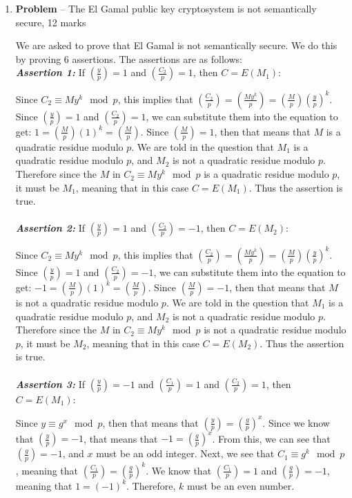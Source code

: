 \documentclass[11pt]{article}
\theoremstyle{definition}
\newcounter{problem}
\providecommand{\Leg}[2]{\genfrac{(}{)}{}{}{#1}{#2}}
\begin{document}
\begin{enumerate}
\begin{enumerate}
\end{enumerate}

\newpage

\item[] \textbf{Problem \theproblem} -- The El Gamal public key cryptosystem is not
    semantically secure, 12 marks

We are asked to prove that El Gamal is not semantically secure. We do this by proving 6 assertions. The assertions are as follows: \\

\textbf{\textit{Assertion 1:}} If $\Leg{y}{p} = 1$ and $\Leg{C_2}{p} = 1$, then $C = E(M_1)$:

Since $C_2 \equiv My^k \mod{p}$, this implies that $\Leg{C_2}{p} = \Leg{My^k}{p} = \Leg{M}{p} \Leg{y}{p}^k$. Since $\Leg{y}{p} = 1$ and $\Leg{C_2}{p} = 1$, we can substitute them into the equation to get: $1 = \Leg{M}{p} (1)^k = \Leg{M}{p}$. Since $\Leg{M}{p} = 1$, then that means that $M$ is a quadratic residue modulo $p$. We are told in the question that $M_1$ is a quadratic residue modulo $p$, and $M_2$ is not a quadratic residue modulo $p$. Therefore since the $M$ in $C_2 \equiv My^k \mod{p}$ is a quadratic residue modulo $p$, it must be $M_1$, meaning that in this case $C = E(M_1)$. Thus the assertion is true. \\ \\


\textbf{\textit{Assertion 2:}} If $\Leg{y}{p} = 1$ and $\Leg{C_2}{p} = -1$, then $C = E(M_2)$:

Since $C_2 \equiv My^k \mod{p}$, this implies that $\Leg{C_2}{p} = \Leg{My^k}{p} = \Leg{M}{p} \Leg{y}{p}^k$. Since $\Leg{y}{p} = 1$ and $\Leg{C_2}{p} = -1$, we can substitute them into the equation to get: $-1 = \Leg{M}{p} (1)^k = \Leg{M}{p}$. Since $\Leg{M}{p} = -1$, then that means that $M$ is not a quadratic residue modulo $p$. We are told in the question that $M_1$ is a quadratic residue modulo $p$, and $M_2$ is not a quadratic residue modulo $p$. Therefore since the $M$ in $C_2 \equiv My^k \mod{p}$ is not a quadratic residue modulo $p$, it must be $M_2$, meaning that in this case $C = E(M_2)$. Thus the assertion is true. \\ \\


\textbf{\textit{Assertion 3:}} If $\Leg{y}{p} = -1$ and $\Leg{C_1}{p} = 1$ and $\Leg{C_2}{p} = 1$, then $C = E(M_1)$:

Since $y \equiv g^x \mod{p}$, then that means that $\Leg{y}{p} = \Leg{g}{p}^x$. Since we know that $\Leg{y}{p} = -1$, that means that $-1 = \Leg{g}{p}^x$. From this, we can see that $\Leg{g}{p} = -1$, and $x$ must be an odd integer. Next, we see that $C_1 \equiv g^k \mod{p}$, meaning that $\Leg{C_1}{p} = \Leg{g}{p}^k$. We know that $\Leg{C_1}{p} = 1$ and $\Leg{g}{p} = -1$, meaning that $1 = (-1)^k$. Therefore, $k$ must be an even number. \\


\end{enumerate}
\end{document}
